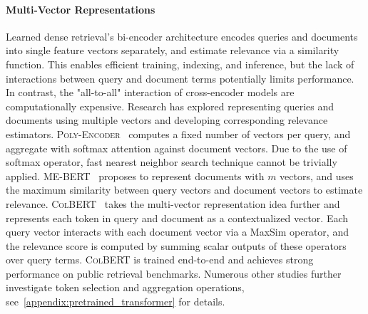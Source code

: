 \paragraph{Multi-Vector Representations}
Learned dense retrieval's bi-encoder architecture encodes queries and documents into single feature vectors separately, and estimate relevance via a similarity function. This enables efficient training, indexing, and inference, but the lack of interactions between query and document terms potentially limits performance. In contrast, the "all-to-all" interaction of cross-encoder models are computationally expensive. 
Research has explored representing queries and documents using multiple vectors and developing corresponding relevance estimators. \textsc{Poly-Encoder}~\cite{Humeau2020Poly-encoders} computes a fixed number of vectors per query, and aggregate with softmax attention against document vectors. Due to the use of softmax operator, fast nearest neighbor search technique cannot be trivially applied.
\textsc{ME-BERT}~\cite{luan2021sparse} proposes to represent documents with $m$ vectors, and uses the maximum similarity between query vectors and document vectors to estimate relevance. 
\textsc{ColBERT}~\cite{khattab2020colbert} takes the multi-vector representation idea further and represents each token in query and document as a contextualized vector. Each query vector interacts with each document vector via a MaxSim operator, and the relevance score is computed by summing scalar outputs of these operators over query terms. \textsc{ColBERT} is trained end-to-end and achieves strong performance on public retrieval benchmarks. Numerous other studies further investigate token selection and aggregation operations, see~\cref{appendix:pretrained_transformer} for details.

